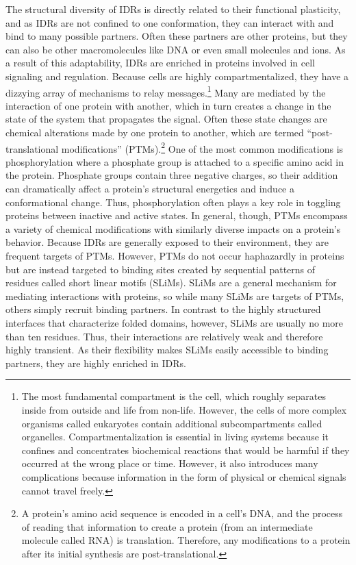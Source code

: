 The structural diversity of IDRs is directly related to their functional plasticity, and as IDRs are not confined to one conformation, they can interact with and bind to many possible partners. Often these partners are other proteins, but they can also be other macromolecules like DNA or even small molecules and ions. As a result of this adaptability, IDRs are enriched in proteins involved in cell signaling and regulation. Because cells are highly compartmentalized, they have a dizzying array of mechanisms to relay messages.\footnote{The most fundamental compartment is the cell, which roughly separates inside from outside and life from non-life. However, the cells of more complex organisms called eukaryotes contain additional subcompartments called organelles. Compartmentalization is essential in living systems because it confines and concentrates biochemical reactions that would be harmful if they occurred at the wrong place or time. However, it also introduces many complications because information in the form of physical or chemical signals cannot travel freely.} Many are mediated by the interaction of one protein with another, which in turn creates a change in the state of the system that propagates the signal. Often these state changes are chemical alterations made by one protein to another, which are termed ``post-translational modifications'' (PTMs).\footnote{A protein's amino acid sequence is encoded in a cell's DNA, and the process of reading that information to create a protein (from an intermediate molecule called RNA) is translation. Therefore, any modifications to a protein after its initial synthesis are post-translational.} One of the most common modifications is phosphorylation where a phosphate group is attached to a specific amino acid in the protein. Phosphate groups contain three negative charges, so their addition can dramatically affect a protein's structural energetics and induce a conformational change. Thus, phosphorylation often plays a key role in toggling proteins between inactive and active states. In general, though, PTMs encompass a variety of chemical modifications with similarly diverse impacts on a protein's behavior. Because IDRs are generally exposed to their environment, they are frequent targets of PTMs. However, PTMs do not occur haphazardly in proteins but are instead targeted to binding sites created by sequential patterns of residues called short linear motifs (SLiMs). SLiMs are a general mechanism for mediating interactions with proteins, so while many SLiMs are targets of PTMs, others simply recruit binding partners. In contrast to the highly structured interfaces that characterize folded domains, however, SLiMs are usually no more than ten residues. Thus, their interactions are relatively weak and therefore highly transient. As their flexibility makes SLiMs easily accessible to binding partners, they are highly enriched in IDRs.

